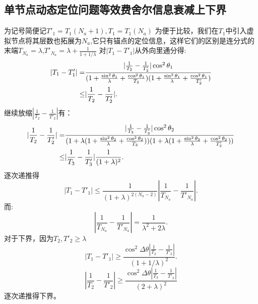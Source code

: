 \subsection{单节点动态定位问题等效费舍尔信息衰减上下界}\label{B_F_2}
为记号简便记$T'_1=T_1(N_a+1),T_1=T_1(N_a)$
为便于比较，我们在$T_1$中引入虚拟节点将其层数也拓展为$N_a$,它只有锚点的定位信息，这样它们的区别是连分式的末端$T_{N_a}=\lambda$,$T'_{N_a}=\lambda+\frac{1}{1+1/\lambda}$
对$|T_1-T'_1|$从外向里通分得:
\begin{align}\notag
|T_1-T'_1|=&\frac{|\frac{1}{T_2}-\frac{1}{T'_2}|\cos^2\theta_1}{(1+\frac{\sin^2\theta_1}{\lambda}+\frac{\cos^2\theta_1}{T_2})
(1+\frac{\sin^2\theta_1}{\lambda}+\frac{\cos^2\theta_1}{T'_2})}\\
\leq &|\frac{1}{T_2}-\frac{1}{T'_2}|.
\end{align}
继续放缩$|\frac{1}{T_2}-\frac{1}{T'_2}|$有：
\begin{align}\notag
|\frac{1}{T_2}-\frac{1}{T'_2}|= & \frac{|\frac{1}{T_3}-\frac{1}{T'_3}|\cos^2\theta_2}{(1+\lambda(1+\frac{\sin^2\theta_2}{\lambda}+\frac{\cos^2\theta_2}{T_3}))
(1+\lambda(1+\frac{\sin^2\theta_2}{\lambda}+\frac{\cos^2\theta_2}{T'_3}))}\\
\leq & |\frac{1}{T_3}-\frac{1}{T'_3}|\frac{1}{(1+\lambda)^2}.
\end{align}
逐次递推得
\begin{equation}
|T_1-T'_1|\leq \frac{1}{(1+\lambda)^{2(N_a-2)}} |\frac{1}{T_{N_a}}-\frac{1}{T'_{N_a}}|.
\end{equation}
而:
\begin{equation}
|\frac{1}{T_{N_a}}-\frac{1}{T'_{N_a}}|=\frac{1}{\lambda^2+2\lambda}.
\end{equation}
对于下界，因为$T_2,T'_2\geq \lambda$
\begin{equation}
|T_1-T'_1|\geq \frac{\cos^2\Delta\theta|\frac{1}{T_2}-\frac{1}{T'_2}|}{(1+1/\lambda)^2}.
\end{equation}
\begin{equation}
|\frac{1}{T_2}-\frac{1}{T'_2}|\geq \frac{\cos^2\Delta\theta|\frac{1}{T_3}-\frac{1}{T'_3}|}{(2+\lambda)^2}
\end{equation}
逐次递推得下界。
